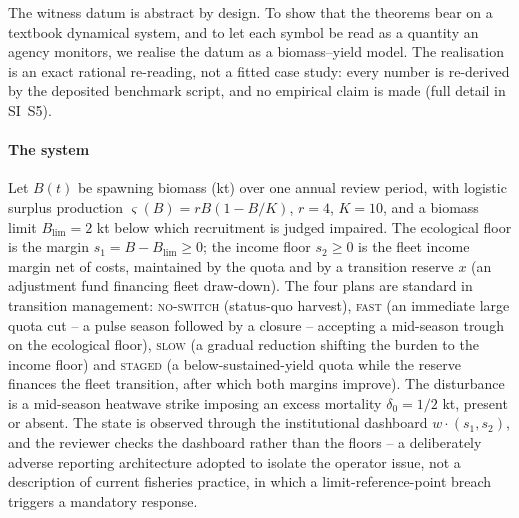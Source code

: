 \documentclass[preprint,11pt,authoryear]{elsarticle}
\theoremstyle{definition}
\theoremstyle{remark}
\newcommand{\act}[1]{\textsc{#1}}
\begin{document}
The witness datum is abstract by design. To show that the theorems bear on a textbook dynamical system, and to let each symbol be read as a quantity an agency monitors, we realise the datum as a \citet{Schaefer1954} biomass--yield model. The realisation is an exact rational re-reading, not a fitted case study: every number is re-derived by the deposited benchmark script, and no empirical claim is made (full detail in SI~S5).

\paragraph{The system} Let $B(t)$ be spawning biomass (kt) over one annual review period, with logistic surplus production $\varsigma(B)=rB(1-B/K)$, $r=4$, $K=10$, and a biomass limit $B_{\mathrm{lim}}=2$ kt below which recruitment is judged impaired. The ecological floor is the margin $s_1=B-B_{\mathrm{lim}}\ge0$; the income floor $s_2\ge0$ is the fleet income margin net of costs, maintained by the quota and by a transition reserve $x$ (an adjustment fund financing fleet draw-down). The four plans are standard in transition management: \act{no-switch} (status-quo harvest), \act{fast} (an immediate large quota cut -- a pulse season followed by a closure -- accepting a mid-season trough on the ecological floor), \act{slow} (a gradual reduction shifting the burden to the income floor) and \act{staged} (a below-sustained-yield quota while the reserve finances the fleet transition, after which both margins improve). The disturbance is a mid-season heatwave strike imposing an excess mortality $\delta_0=1/2$ kt, present or absent. The state is observed through the institutional dashboard $w\cdot(s_1,s_2)$, and the reviewer checks the dashboard rather than the floors -- a deliberately adverse reporting architecture adopted to isolate the operator issue, not a description of current fisheries practice, in which a limit-reference-point breach triggers a mandatory response.
\end{document}
